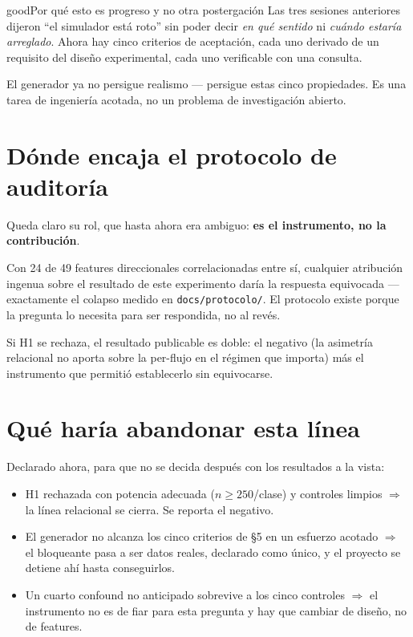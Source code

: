 \documentclass[11pt]{article}
\newcommand{\code}[1]{\texttt{\small #1}}
\begin{document}
\begin{cbox}{good}{Por qué esto es progreso y no otra postergación}
Las tres sesiones anteriores dijeron ``el simulador está roto'' sin poder decir \emph{en qué sentido} ni \emph{cuándo estaría arreglado}. Ahora hay cinco criterios de aceptación, cada uno derivado de un requisito del diseño experimental, cada uno verificable con una consulta.

\medskip
El generador ya no persigue realismo --- persigue estas cinco propiedades. Es una tarea de ingeniería acotada, no un problema de investigación abierto.
\end{cbox}

\section{Dónde encaja el protocolo de auditoría}

Queda claro su rol, que hasta ahora era ambiguo: \textbf{es el instrumento, no la contribución}.

Con 24 de 49 features direccionales correlacionadas entre sí, cualquier atribución ingenua sobre el resultado de este experimento daría la respuesta equivocada --- exactamente el colapso medido en \code{docs/protocolo/}. El protocolo existe porque la pregunta lo necesita para ser respondida, no al revés.

Si H1 se rechaza, el resultado publicable es doble: el negativo (la asimetría relacional no aporta sobre la per-flujo en el régimen que importa) más el instrumento que permitió establecerlo sin equivocarse.

\section{Qué haría abandonar esta línea}

Declarado ahora, para que no se decida después con los resultados a la vista:

\begin{itemize}[leftmargin=1.3em,itemsep=1pt]
  \item H1 rechazada con potencia adecuada ($n \ge 250$/clase) y controles limpios $\Rightarrow$ la línea relacional se cierra. Se reporta el negativo.
  \item El generador no alcanza los cinco criterios de \S5 en un esfuerzo acotado $\Rightarrow$ el bloqueante pasa a ser datos reales, declarado como único, y el proyecto se detiene ahí hasta conseguirlos.
  \item Un cuarto confound no anticipado sobrevive a los cinco controles $\Rightarrow$ el instrumento no es de fiar para esta pregunta y hay que cambiar de diseño, no de features.
\end{itemize}
\end{document}
